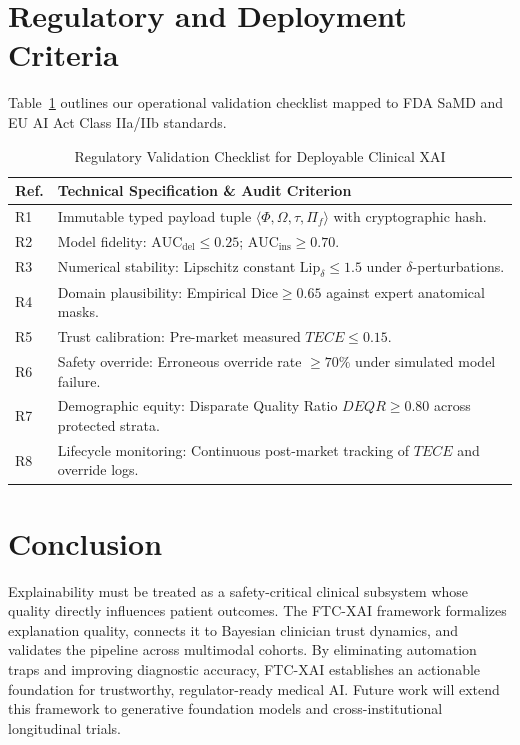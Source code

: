 \documentclass[10pt,journal,compsoc]{IEEEtran}
\begin{document}
\section{Regulatory and Deployment Criteria}
Table~\ref{tab:regulatory} outlines our operational validation checklist mapped to FDA SaMD and EU AI Act Class IIa/IIb standards.

\begin{table}[htbp]
\caption{Regulatory Validation Checklist for Deployable Clinical XAI}
\label{tab:regulatory}
\centering
\begin{tabular}{lp{6.2cm}}
\toprule
Ref. & Technical Specification \& Audit Criterion \\
\midrule
R1 & Immutable typed payload tuple $\langle \Phi, \Omega, \tau, \Pi_f \rangle$ with cryptographic hash. \\
R2 & Model fidelity: $\text{AUC}_{\text{del}} \le 0.25$; $\text{AUC}_{\text{ins}} \ge 0.70$. \\
R3 & Numerical stability: Lipschitz constant $\text{Lip}_\delta \le 1.5$ under $\delta$-perturbations. \\
R4 & Domain plausibility: Empirical $\text{Dice} \ge 0.65$ against expert anatomical masks. \\
R5 & Trust calibration: Pre-market measured $TECE \le 0.15$. \\
R6 & Safety override: Erroneous override rate $\ge 70\%$ under simulated model failure. \\
R7 & Demographic equity: Disparate Quality Ratio $DEQR \ge 0.80$ across protected strata. \\
R8 & Lifecycle monitoring: Continuous post-market tracking of $TECE$ and override logs. \\
\bottomrule
\end{tabular}
\end{table}

\section{Conclusion}
Explainability must be treated as a safety-critical clinical subsystem whose quality directly influences patient outcomes. The FTC-XAI framework formalizes explanation quality, connects it to Bayesian clinician trust dynamics, and validates the pipeline across multimodal cohorts. By eliminating automation traps and improving diagnostic accuracy, FTC-XAI establishes an actionable foundation for trustworthy, regulator-ready medical AI. Future work will extend this framework to generative foundation models and cross-institutional longitudinal trials.
\end{document}

